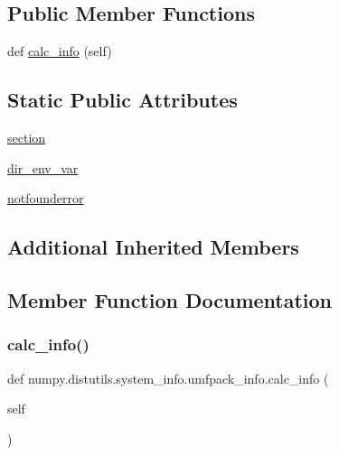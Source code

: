 \subsection*{Public Member Functions}
\begin{DoxyCompactItemize}
\item 
def \hyperlink{classnumpy_1_1distutils_1_1system__info_1_1umfpack__info_a433f18e280ea692a6e0ccb2495e53e72}{calc\+\_\+info} (self)
\end{DoxyCompactItemize}
\subsection*{Static Public Attributes}
\begin{DoxyCompactItemize}
\item 
\hyperlink{classnumpy_1_1distutils_1_1system__info_1_1umfpack__info_ae4a10e2a0bf2a22b285142f31d9a9073}{section}
\item 
\hyperlink{classnumpy_1_1distutils_1_1system__info_1_1umfpack__info_a04340b38efe27c050139c19703755db2}{dir\+\_\+env\+\_\+var}
\item 
\hyperlink{classnumpy_1_1distutils_1_1system__info_1_1umfpack__info_a4611b6c89f77684baf962e671bad467b}{notfounderror}
\end{DoxyCompactItemize}
\subsection*{Additional Inherited Members}


\subsection{Member Function Documentation}
\mbox{\label{classnumpy_1_1distutils_1_1system__info_1_1umfpack__info_a433f18e280ea692a6e0ccb2495e53e72}} 
\subsubsection{\texorpdfstring{calc\+\_\+info()}{calc\_info()}}
{\footnotesize\ttfamily def numpy.\+distutils.\+system\+\_\+info.\+umfpack\+\_\+info.\+calc\+\_\+info (\begin{DoxyParamCaption}\item[{}]{self }\end{DoxyParamCaption})}



